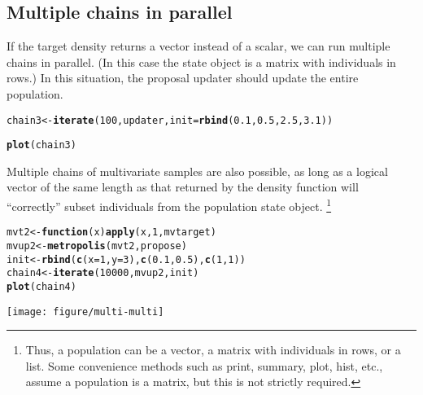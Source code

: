 \documentclass{article}\usepackage[]{graphicx}\usepackage[]{color}
\makeatletter
\def\maxwidth{ %
  \ifdim\Gin@nat@width>\linewidth
    \linewidth
  \else
    \Gin@nat@width
  \fi
}
\newcommand{\hlnum}[1]{\textcolor[rgb]{0.686,0.059,0.569}{#1}}%
\newcommand{\hlstd}[1]{\textcolor[rgb]{0.345,0.345,0.345}{#1}}%
\newcommand{\hlkwa}[1]{\textcolor[rgb]{0.161,0.373,0.58}{\textbf{#1}}}%
\newcommand{\hlkwb}[1]{\textcolor[rgb]{0.69,0.353,0.396}{#1}}%
\newcommand{\hlkwc}[1]{\textcolor[rgb]{0.333,0.667,0.333}{#1}}%
\newcommand{\hlkwd}[1]{\textcolor[rgb]{0.737,0.353,0.396}{\textbf{#1}}}%
\newenvironment{kframe}{%
 \def\at@end@of@kframe{}%
 \ifinner\ifhmode%
  \def\at@end@of@kframe{\end{minipage}}%
  \begin{minipage}{\columnwidth}%
 \fi\fi%
 \def\FrameCommand##1{\hskip\@totalleftmargin \hskip-\fboxsep
 \colorbox{shadecolor}{##1}\hskip-\fboxsep
     \hskip-\linewidth \hskip-\@totalleftmargin \hskip\columnwidth}%
 \MakeFramed {\advance\hsize-\width
   \@totalleftmargin\z@ \linewidth\hsize
   \@setminipage}}%
 {\par\unskip\endMakeFramed%
 \at@end@of@kframe}
\newenvironment{knitrout}{}{} %
\makeatother
\begin{document}
\subsection{Multiple chains in parallel}
If the target density returns a vector instead of a scalar, we can run
multiple chains in parallel. (In this case the state object is a
matrix with individuals in rows.) In this situation, the proposal
updater should update the entire population.
\begin{knitrout}
\color{fgcolor}\begin{kframe}
\begin{alltt}
\hlstd{chain3} \hlkwb{<-} \hlkwd{iterate}\hlstd{(}\hlnum{100}\hlstd{, updater,} \hlkwc{init} \hlstd{=} \hlkwd{rbind}\hlstd{(}\hlnum{0.1}\hlstd{,} \hlnum{0.5}\hlstd{,} \hlnum{2.5}\hlstd{,} \hlnum{3.1}\hlstd{))}
\end{alltt}


{\ttfamily\noindent\bfseries\color{errorcolor}{\#\# Error: invalid arguments}}\begin{alltt}
\hlkwd{plot}\hlstd{(chain3)}
\end{alltt}


{\ttfamily\noindent\bfseries\color{errorcolor}{\#\# Error: object 'chain3' not found}}\end{kframe}
\end{knitrout}


Multiple chains of multivariate samples are also possible, as long as
a logical vector of the same length as that returned by the density
function will ``correctly'' subset individuals from the population
state object. \footnote{Thus, a population can be a vector, a matrix with
individuals in rows, or a list. Some convenience methods such as
print, summary, plot, hist, etc., assume a population is a matrix, but
this is not strictly required.}
\begin{knitrout}
\color{fgcolor}\begin{kframe}
\begin{alltt}
\hlstd{mvt2} \hlkwb{<-} \hlkwa{function}\hlstd{(}\hlkwc{x}\hlstd{)} \hlkwd{apply}\hlstd{(x,} \hlnum{1}\hlstd{, mvtarget)}
\hlstd{mvup2} \hlkwb{<-} \hlkwd{metropolis}\hlstd{(mvt2, propose)}
\hlstd{init} \hlkwb{<-} \hlkwd{rbind}\hlstd{(}\hlkwd{c}\hlstd{(}\hlkwc{x} \hlstd{=} \hlnum{1}\hlstd{,} \hlkwc{y} \hlstd{=} \hlnum{3}\hlstd{),} \hlkwd{c}\hlstd{(}\hlnum{0.1}\hlstd{,} \hlnum{0.5}\hlstd{),} \hlkwd{c}\hlstd{(}\hlnum{1}\hlstd{,} \hlnum{1}\hlstd{))}
\hlstd{chain4} \hlkwb{<-} \hlkwd{iterate}\hlstd{(}\hlnum{10000}\hlstd{, mvup2, init)}
\hlkwd{plot}\hlstd{(chain4)}
\end{alltt}
\end{kframe}
\texttt{[image: figure/multi-multi]} 

\end{knitrout}
\end{document}
